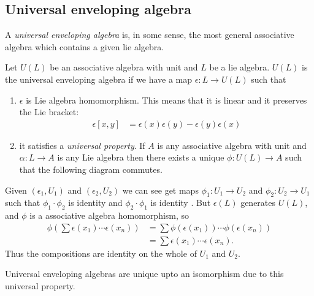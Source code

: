 \subsection{Universal enveloping algebra}
\label{sub:universal_enveloping_algebra}

A \emph{universal enveloping algebra} is, in some sense, the most general associative algebra which contains a given lie algebra. 

Let $U(L)$ be an associative algebra with unit and $L$ be a lie algebra. $U(L)$ is the universal enveloping algebra if we have a map $\epsilon: L\to U(L)$ such that
\begin{enumerate}
    \makethislistcompact
    \item $\epsilon$ is Lie algebra homomorphism. This means that it is linear and it preserves the Lie bracket:
        \begin{align}
            \epsilon[x,y] &= \epsilon(x)\epsilon(y) - \epsilon(y) \epsilon(x)
        \end{align}
    \item it satisfies a \emph{universal property}. If $A$ is any associative algebra with unit and $\alpha: L \to A $ is any Lie algebra then there exists a unique $\phi: U(L)\to A$ such that the following diagram commutes.
        \begin{center}
        \end{center}
\end{enumerate}
\begin{insight}
    Given $(\epsilon_1, U_1)$ and $(\epsilon_2,U_2)$ we can see get maps $\phi_1: U_1\to U_2$  and $\phi_2: U_2\to U_1$ such that 
    $\phi_1\cdot\phi_2$ is identity  and 
    $\phi_2\cdot\phi_1$ is identity . 
    But $\epsilon(L)$ generates $U(L)$, and $\phi$ is a associative algebra homomorphism, so 
    \begin{align}
        \phi\left(\sum \epsilon(x_1)\cdots\epsilon(x_n)\right) &= \sum \phi(\epsilon(x_1))\cdots\phi(\epsilon(x_n))\\
            &= \sum \epsilon(x_1)\cdots\epsilon(x_n).
    \end{align}
    Thus the compositions are identity on the whole of $U_1$ and $U_2$.
    
\end{insight}
Universal enveloping algebras are unique upto an isomorphism due to this universal property.


